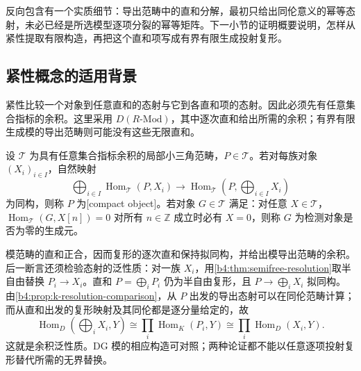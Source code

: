 反向包含有一个实质细节：导出范畴中的直和分解，最初只给出同伦意义的幂等态射，未必已经是所选模型逐项分裂的幂等矩阵。下一小节的证明概要说明，怎样从紧性提取有限构造，再把这个直和项写成有界有限生成投射复形。

\subsection{紧性概念的适用背景}
\label{b4:subsec:2002:03}

紧性比较一个对象到任意直和的态射与它到各直和项的态射。因此必须先有任意集合指标的余积。这里采用 \(D(R\text{-}\mathrm{Mod})\)，其中逐次直和给出所需的余积；有界有限生成模的导出范畴则可能没有这些无限直和。

\begin{definition}\label{b4:def:compact-object}
	设 \(\mathcal T\) 为具有任意集合指标余积的局部小三角范畴，\(P\in\mathcal T\)。若对每族对象 \((X_i)_{i\in I}\)，自然映射
	\[
		\bigoplus_{i\in I}\operatorname{Hom}_{\mathcal T}(P,X_i) \longrightarrow\operatorname{Hom}_{\mathcal T}\left(P,\bigoplus_{i\in I}X_i\right)
	\]
	为同构，则称 \(P\) 为[compact object]。若对象 \(G\in\mathcal T\) 满足：对任意 \(X\in\mathcal T\)，\(\operatorname{Hom}_{\mathcal T}(G,X[n])=0\) 对所有 \(n\in\mathbb Z\) 成立时必有 \(X=0\)，则称 \(G\) 为检测对象是否为零的生成元。
\end{definition}

模范畴的直和正合，因而复形的逐次直和保持拟同构，并给出模导出范畴的余积。后一断言还须检验态射的泛性质：对一族 \(X_i\)，用\cref{b4:thm:semifree-resolution}取半自由替换 \(P_i\to X_i\)。直和 \(P=\bigoplus_iP_i\) 仍为半自由复形，且 \(P\to\bigoplus_iX_i\) 拟同构。由\cref{b4:prop:k-resolution-comparison}，从 \(P\) 出发的导出态射可以在同伦范畴计算；而从直和出发的复形映射及其同伦都是逐分量给定的，故
\[
	\operatorname{Hom}_D\left(\bigoplus_iX_i,Y\right) \cong\prod_i\operatorname{Hom}_K(P_i,Y) \cong\prod_i\operatorname{Hom}_D(X_i,Y).
\]
这就是余积泛性质。DG 模的相应构造可对照\cite[Sections 3.1 and 4.1]{Keller1994DerivingDG}；两种论证都不能以任意逐项投射复形替代所需的无界替换。

